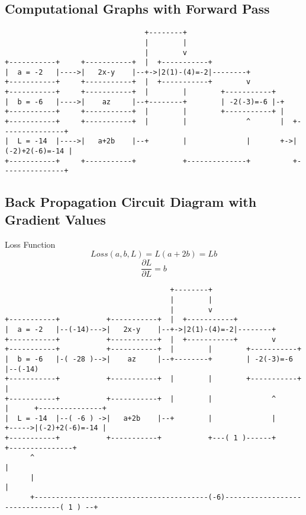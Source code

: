 \documentclass{article}
\begin{document}
\subsection{Computational Graphs with Forward Pass}
\begin{verbatim}
                                 +--------+
                                 |        |
                                 |        v
+-----------+     +-----------+  |  +-----------+
|  a = -2   |---->|   2x-y    |--+->|2(1)-(4)=-2|--------+
+-----------+     +-----------+  |  +-----------+        v
+-----------+     +-----------+  |        |        +-----------+
|  b = -6   |---->|    az     |--+--------+        | -2(-3)=-6 |-+
+-----------+     +-----------+  |        |        +-----------+ |
+-----------+     +-----------+  |        |              ^       |  +---------------+
|  L = -14  |---->|   a+2b    |--+        |              |       +->|(-2)+2(-6)=-14 |
+-----------+     +-----------+           +--------------+          +---------------+
\end{verbatim}
\subsection{Back Propagation Circuit Diagram with Gradient Values}
Loss Function
\begin{equation}
	Loss(a,b,L) = L(a + 2b) = Lb
\end{equation}
\begin{equation}
	\frac{ \partial L}{\partial L} = b
\end{equation}
\small
\begin{verbatim}
                                       +--------+
                                       |        |
                                       |        v
+-----------+           +-----------+  |  +-----------+
|  a = -2   |--(-14)--->|   2x-y    |--+->|2(1)-(4)=-2|--------+
+-----------+           +-----------+  |  +-----------+        v
+-----------+           +-----------+  |        |        +-----------+
|  b = -6   |-( -28 )-->|    az     |--+--------+        | -2(-3)=-6 |--(-14)
+-----------+           +-----------+  |        |        +-----------+      |
+-----------+           +-----------+  |        |              ^            |      +---------------+
|  L = -14  |--( -6 ) ->|   a+2b    |--+        |              |            +----->|(-2)+2(-6)=-14 |
+-----------+           +-----------+           +---( 1 )------+                   +---------------+
      ^                                                                                    |
      |                                                                                    |
      +-----------------------------------------(-6)-------------------------------( 1 ) --+
\end{verbatim}
\normalsize
\end{document}
